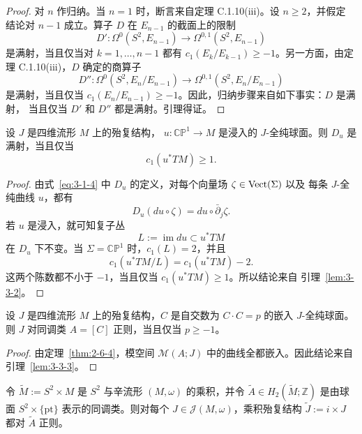 \begin{proof}
对 $n$ 作归纳。当 $n=1$ 时，断言来自定理 C.1.10\textup{(iii)}。设 $n\ge2$，并假定
结论对 $n-1$ 成立。算子 $D$ 在 $E_{n-1}$ 的截面上的限制
\[
  D':\Omega^0(S^2,E_{n-1})
  \longrightarrow\Omega^{0,1}(S^2,E_{n-1})
\]
是满射，当且仅当对 $k=1,\ldots,n-1$ 都有
$c_1(E_k/E_{k-1})\ge-1$。另一方面，由定理 C.1.10\textup{(iii)}，$D$ 确定的商算子
\[
  D'':\Omega^0(S^2,E_n/E_{n-1})
  \longrightarrow\Omega^{0,1}(S^2,E_n/E_{n-1})
\]
是满射，当且仅当 $c_1(E_n/E_{n-1})\ge-1$。因此，归纳步骤来自如下事实：$D$ 是满射，
当且仅当 $D'$ 和 $D''$ 都是满射。引理得证。
\end{proof}

\begin{lemma}\label{lem:3-3-3}
设 $J$ 是四维流形 $M$ 上的殆复结构，
$u:\mathbb{CP}^1\to M$ 是浸入的 $J$-全纯球面。则 $D_u$ 是满射，当且仅当
\[
  c_1(u^*TM)\ge1.
\]
\end{lemma}

\begin{proof}
由式~\eqref{eq:3-1-4} 中 $D_u$ 的定义，对每个向量场 $\zeta\in\operatorname{Vect}(\Sigma)$ 以及
每条 $J$-全纯曲线 $u$，都有
\[
  D_u(du\circ\zeta)=du\circ\bar\partial_j\zeta.
\]
若 $u$ 是浸入，就可知复子丛
\[
  L:=\operatorname{im}du\subset u^*TM
\]
在 $D_u$ 下不变。当 $\Sigma=\mathbb{CP}^1$ 时，$c_1(L)=2$，并且
\[
  c_1(u^*TM/L)=c_1(u^*TM)-2.
\]
这两个陈数都不小于 $-1$，当且仅当 $c_1(u^*TM)\ge1$。所以结论来自
引理~\ref{lem:3-3-2}。
\end{proof}

\begin{corollary}\label{cor:3-3-4}
设 $J$ 是四维流形 $M$ 上的殆复结构，$C$ 是自交数为 $C\cdot C=p$ 的嵌入
$J$-全纯球面。则 $J$ 对同调类 $A=[C]$ 正则，当且仅当 $p\ge-1$。
\end{corollary}

\begin{proof}
由定理~\ref{thm:2-6-4}，模空间 $\mathcal M(A;J)$ 中的曲线全都嵌入。因此结论来自
引理~\ref{lem:3-3-3}。
\end{proof}

\begin{corollary}\label{cor:3-3-5}
令 $\widetilde M:=S^2\times M$ 是 $S^2$ 与辛流形 $(M,\omega)$ 的乘积，并令
$\widetilde A\in H_2(\widetilde M;\mathbb Z)$ 是由球面 $S^2\times\{\mathrm{pt}\}$
表示的同调类。则对每个 $J\in\mathcal J(M,\omega)$，乘积殆复结构
$\widetilde J:=i\times J$ 都对 $\widetilde A$ 正则。
\end{corollary}

